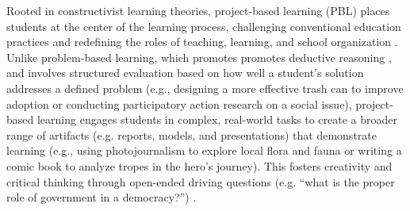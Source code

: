 Rooted in constructivist learning theories, project-based learning (PBL) places students at the center of the learning process, challenging conventional education practices and redefining the roles of teaching, learning, and school organization \cite{fitzgerald2020overlapping, guo2023effects, kokotsaki2016project, woods2024}.  
Unlike problem-based learning, which promotes promotes deductive reasoning \cite{condliffe2017project, thomas1999project}, and involves structured evaluation based on how well a student’s solution addresses a defined problem (e.g., designing a more effective trash can to improve adoption or conducting participatory action research on a social issue), project-based learning engages students in complex, real-world tasks to create a broader range of artifacts (e.g. reports, models, and presentations) that demonstrate learning \cite{krajcik2006project, oguz2014comparison, thomas2010review, chen2019revisiting, barron2008teaching, thomas1999project} (e.g., using photojournalism to explore local flora and fauna or writing a comic book to analyze tropes in the hero’s journey). 
This fosters creativity and critical thinking through open-ended driving questions (e.g. “what is the proper role of government in a democracy?”) \cite{parker2011rethinking, blumenfeld1991motivating, diehl1999project, svihla2020facilitating}.
